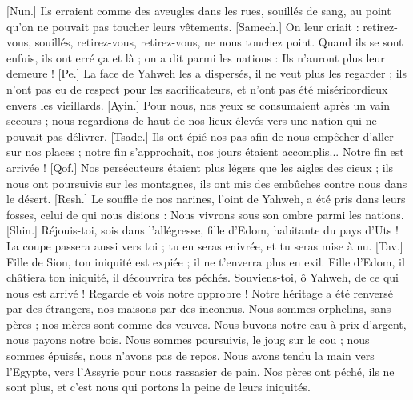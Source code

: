 \begin{multicols}{2}
[Nun.] Ils erraient comme des aveugles dans les rues, souillés de sang, au point qu'on ne pouvait pas toucher leurs vêtements.
[Samech.] On leur criait : retirez-vous, souillés, retirez-vous, retirez-vous, ne nous touchez point. Quand ils se sont enfuis, ils ont erré ça et là ; on a dit parmi les nations : Ils n'auront plus leur demeure !
[Pe.] La face de Yahweh les a dispersés, il ne veut plus les regarder ; ils n’ont pas eu de respect pour les sacrificateurs, et n'ont pas été miséricordieux envers les vieillards.
[Ayin.] Pour nous, nos yeux se consumaient après un vain secours ; nous regardions de haut de nos lieux élevés vers une nation qui ne pouvait pas délivrer.
[Tsade.] Ils ont épié nos pas afin de nous empêcher d'aller sur nos places ; notre fin s'approchait, nos jours étaient accomplis... Notre fin est arrivée !
[Qof.] Nos persécuteurs étaient plus légers que les aigles des cieux ; ils nous ont poursuivis sur les montagnes, ils ont mis des embûches contre nous dans le désert.
[Resh.] Le souffle de nos narines, l’oint de Yahweh, a été pris dans leurs fosses, celui de qui nous disions : Nous vivrons sous son ombre parmi les nations.
[Shin.] Réjouis-toi, sois dans l’allégresse, fille d’Edom, habitante du pays d'Uts ! La coupe passera aussi vers toi ; tu en seras enivrée, et tu seras mise à nu.
[Tav.] Fille de Sion, ton iniquité est expiée ; il ne t'enverra plus en exil. Fille d’Edom, il châtiera ton iniquité, il découvrira tes péchés.
\VerseOne{}Souviens-toi, ô Yahweh, de ce qui nous est arrivé ! Regarde et vois notre opprobre !
Notre héritage a été renversé par des étrangers, nos maisons par des inconnus.
Nous sommes orphelins, sans pères ; nos mères sont comme des veuves.
Nous buvons notre eau à prix d’argent, nous payons notre bois.
Nous sommes poursuivis, le joug sur le cou ; nous sommes épuisés, nous n’avons pas de repos.
Nous avons tendu la main vers l'Egypte, vers l'Assyrie pour nous rassasier de pain.
Nos pères ont péché, ils ne sont plus, et c’est nous qui portons la peine de leurs iniquités.

\end{multicols}
